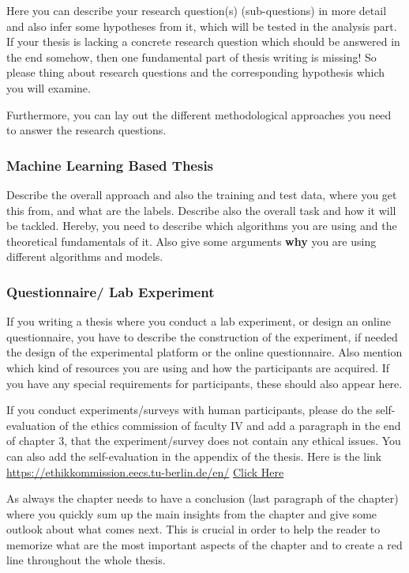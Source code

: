 Here you can describe your research question(s) (sub-questions) in more detail and also infer some hypotheses from it, which will be tested in the analysis part. If your thesis is lacking a concrete research question which should be answered in the end somehow, then one fundamental part of thesis writing is missing! So please thing about research questions and the corresponding hypothesis which you will examine. 

Furthermore, you can lay out the different methodological approaches you need to answer the research questions. 

\subsubsection{Machine Learning Based Thesis}
Describe the overall approach and also the training and test data, where you get this from, and what are the labels. Describe also the overall task and how it will be tackled. Hereby, you need to describe which algorithms you are using and the theoretical fundamentals of it. Also give some arguments \textbf{why} you are using different algorithms and models. 

\subsubsection{Questionnaire/ Lab Experiment}
If you writing a thesis where you conduct a lab experiment, or design an online questionnaire, you have to describe the construction of the experiment, if needed the design of the experimental platform or the online questionnaire. Also mention which kind of resources you are using and how the participants are acquired. If you have any special requirements for participants, these should also appear here. 

If you conduct experiments/surveys with human participants, please do the self-evaluation of the ethics commission of faculty IV and add a paragraph in the end of chapter 3, that the experiment/survey does not contain any ethical issues. You can also add the self-evaluation in the appendix of the thesis. Here is the link \url{https://ethikkommission.eecs.tu-berlin.de/en/} \href{https://ethikkommission.eecs.tu-berlin.de/en/}{Click Here}

As always the chapter needs to have a conclusion (last paragraph of the chapter) where you quickly sum up the main insights from the chapter and give some outlook about what comes next. This is crucial in order to help the reader to memorize what are the most important aspects of the chapter and to create a red line throughout the whole thesis. 